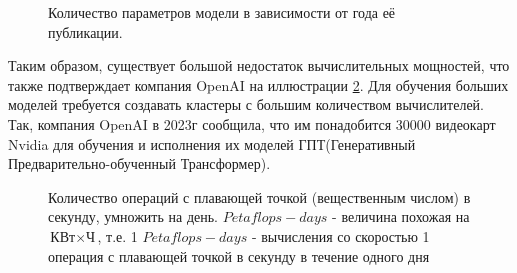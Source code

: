 \begin{figure}[h!]
	\caption{Количество параметров модели в зависимости от года её публикации.}
	\label{ris:ParametersANN}
\end{figure}
Таким образом, существует большой недостаток вычислительных мощностей, что также подтверждает компания OpenAI на иллюстрации \ref{ris:OpenAI}. Для обучения больших моделей требуется создавать кластеры с большим количеством вычислителей. Так, компания OpenAI в 2023г сообщила, что им понадобится 30000 видеокарт Nvidia для обучения и исполнения их моделей ГПТ(Генеративный Предварительно-обученный Трансформер).
\begin{figure}[h!]
	\caption{
		Количество операций с плавающей точкой (вещественным числом) в секунду, умножить на день.
		{\small *$Petaflops-days$ - величина похожая на $\text{КВт}\times\text{Ч}$, т.е. 1 $Petaflops-days$ - вычисления со скоростью 1 операция с плавающей точкой в секунду в течение одного дня}
		}
	\label{ris:OpenAI}
\end{figure}




